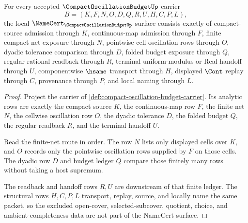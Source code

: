 \begin{theorem}
\label{thm:compact-oscillation-budget-namecert-obligations}
For every accepted $\CompactOscillationBudgetUp$ carrier
$$
B=(K,F,N,O,D,Q,R,U,H,C,P,L),
$$
the local $\NameCert_{\CompactOscillationBudgetUp}$ surface consists exactly of compact-source admission through $K$, continuous-map admission through $F$, finite compact-net exposure through $N$, pointwise cell oscillation rows through $O$, dyadic tolerance comparison through $D$, folded budget exposure through $Q$, regular rational readback through $R$, terminal uniform-modulus or Real handoff through $U$, componentwise $\hsame$ transport through $H$, displayed $\Cont$ replay through $C$, provenance through $P$, and local naming through $L$.
\end{theorem}
\begin{proof}
Project the carrier of \autoref{def:compact-oscillation-budget-carrier}. Its analytic rows are exactly the compact source $K$, the continuous-map row $F$, the finite net $N$, the cellwise oscillation row $O$, the dyadic tolerance $D$, the folded budget $Q$, the regular readback $R$, and the terminal handoff $U$.

Read the finite-net route in order. The row $N$ lists only displayed cells over $K$, and $O$ records only the pointwise oscillation rows supplied by $F$ on those cells. The dyadic row $D$ and budget ledger $Q$ compare those finitely many rows without taking a host supremum.

The readback and handoff rows $R,U$ are downstream of that finite ledger. The structural rows $H,C,P,L$ transport, replay, source, and locally name the same packet, so the excluded open-cover, selected-subcover, quotient, choice, and ambient-completeness data are not part of the NameCert surface.
\end{proof}

